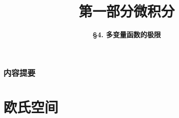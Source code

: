 



\title[Calculus]{\LARGE \bfseries 第一部分\quad 微积分} %
\author[Limit of Multivariate Functions] %
{\Large \bfseries \S 4. 多变量函数的极限
}
\date{}



\begin{frame}
\titlepage %
\end{frame}

\begin{frame}
\frametitle{内容提要} %
\tableofcontents %
\end{frame}


\section{欧氏空间} %

